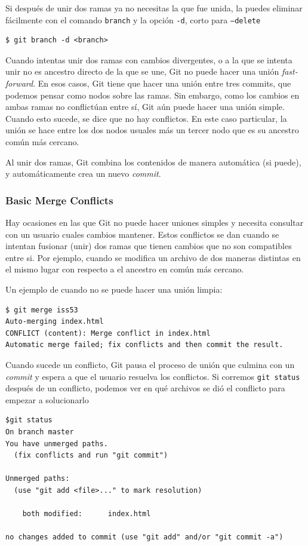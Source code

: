 \documentclass[spanish, 12pt, a4paper]{article}
\begin{document}
Si después de unir dos ramas ya no necesitas la que fue unida, la puedes eliminar fácilmente con el comando \texttt{branch} y la opción \texttt{-d}, corto para \texttt{--delete} 
\begin{lstlisting}
$ git branch -d <branch>
\end{lstlisting}

Cuando intentas unir dos ramas con cambios divergentes, o a la que se intenta unir no es ancestro directo de la que se une, Git no puede hacer una unión \textit{fast-forward}.
En esos casos, Git tiene que hacer una unión entre tres commits, que podemos pensar como nodos sobre las ramas.
Sin embargo, como los cambios en ambas ramas no conflictúan entre sí, Git aún puede hacer una unión simple.
Cuando esto sucede, se dice que no hay conflictos.
En este caso particular, la unión se hace entre los dos nodos usuales más un tercer nodo que es su ancestro común más cercano.

Al unir dos ramas, Git combina los contenidos de manera automática (si puede), y automáticamente crea un nuevo \textit{commit}.

\subsubsection{Basic Merge Conflicts}
Hay ocasiones en las que Git no puede hacer uniones simples y necesita consultar con un usuario cuales cambios mantener.
Estos conflictos se dan cuando se intentan fusionar (unir) dos ramas que tienen cambios que no son compatibles entre si.
Por ejemplo, cuando se modifica un archivo de dos maneras distintas en el mismo lugar con respecto a el ancestro en común más cercano.

Un ejemplo de cuando no se puede hacer una unión limpia:
\begin{lstlisting}
$ git merge iss53
Auto-merging index.html
CONFLICT (content): Merge conflict in index.html
Automatic merge failed; fix conflicts and then commit the result.
\end{lstlisting}

Cuando sucede un conflicto, Git pausa el proceso de unión que culmina con un \textit{commit} y espera a que el usuario resuelva los conflictos.
Si corremos \texttt{git status} después de un conflicto, podemos ver en qué archivos se dió el conflicto para empezar a solucionarlo
\begin{lstlisting}
$git status
On branch master
You have unmerged paths.
  (fix conflicts and run "git commit")

Unmerged paths:
  (use "git add <file>..." to mark resolution)

    both modified:      index.html

no changes added to commit (use "git add" and/or "git commit -a")
\end{lstlisting}
\end{document}
